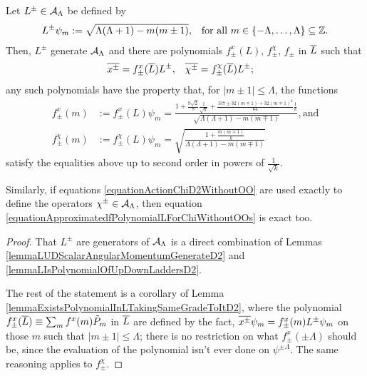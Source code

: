 \begin{proposition}\label{propositionThereAreFunctionsfpmD2}
Let $L^\pm \in \mathcal A_{\Lambda}$ be defined by
\begin{align}
    L^\pm \psi_m &:= \sqrt{\Lambda(\Lambda + 1) - m(m \pm 1)},& \text{for all }m \in \{-\Lambda, \dots, \Lambda\}\subseteq \mathbb{Z}.
\end{align}
Then, $L^\pm$ generate $\mathcal A_\Lambda$ and there are polynomials $f^x_\pm(L)$, $f^\chi_\pm$, $f_\pm$ in $\overline{L}$ such that
\begin{align}
    \overline{x^\pm} &= f^x_{\pm}(\overline{L}) L^\pm,&
    \overline{\chi^\pm} &= f^\chi_{\pm}(\overline{L}) L^\pm;
\end{align}
any such polynomials have the property that, for $|m \pm 1| \leq \Lambda$, the functions
\begin{align}\label{equationApproximatedfPolynomialLForVanillaX}
    f^x_\pm(m) &:= f^x_\pm(L)\psi_m = \frac{1 + \frac{9\sqrt{2}}{8}\frac{1}{\sqrt{k}} + \frac{137 \pm 32(m \mp 1) + 32(m \mp 1)^2}{64}\frac{1}{k}}{\sqrt{\Lambda(\Lambda+1) - m(m \mp 1)}}, \text{and}\\
    \label{equationApproximatedfPolynomialLForChiWithoutOOs}
    f^\chi_\pm(m)&:= f^\chi_\pm(L)\psi_m = \sqrt{\frac{1 + \frac{m(m\mp 1)}{k}}{\Lambda(\Lambda+1) - m(m \mp 1)}}
\end{align}
satisfy the equalities above up to second order in powers of $\frac{1}{\sqrt{k}}$. 

Similarly, if equations \eqref{equationActionChiD2WithoutOO} are used exactly to define the operators $\chi^\pm \in \mathcal A_\Lambda$, then equation \eqref{equationApproximatedfPolynomialLForChiWithoutOOs} is exact too.
\end{proposition}
\begin{proof}
That $L^\pm$ are generators of $\mathcal A_\Lambda$ is a direct combination of Lemmas \ref{lemmaLUDScalarAngularMomentumGenerateD2} and \ref{lemmaLIsPolynomialOfUpDownLaddersD2}.

The rest of the statement is a corollary of Lemma \ref{lemmaExistsPolynomialInLTakingSameGradeToItD2}, where the polynomial $f^x_\pm(\overline{L})  \equiv \sum_m f^x(m) \tilde P_m$ in $\overline{L}$ are defined by the fact, $\overline{x^\pm} \psi_m = f^x_\pm(m) L^\pm \psi_m$ on those $m$ such that $|m \pm 1| \leq \Lambda$; there is no restriction on what $f^x_\pm(\pm \Lambda)$ should be, since the evaluation of the polynomial isn't ever done on $\psi^{\pm \Lambda}$. The same reasoning applies to $f^\chi_\pm$.
\end{proof}

